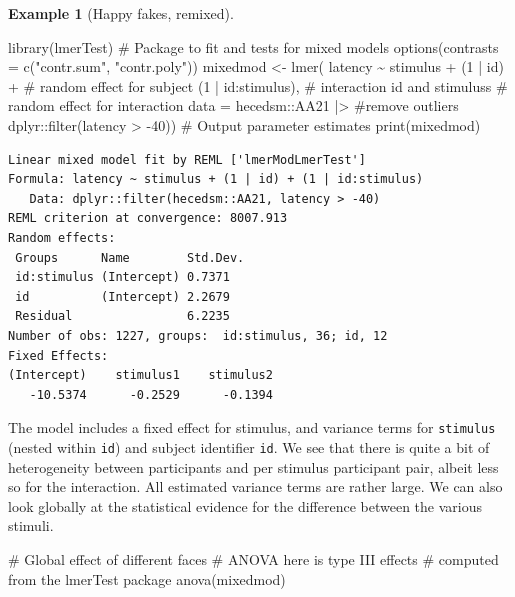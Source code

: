 \documentclass[
  11pt,
  letterpaper,
]{scrbook}
\newenvironment{Shaded}{\begin{snugshade}}{\end{snugshade}}
\newcommand{\AttributeTok}[1]{\textcolor[rgb]{0.40,0.45,0.13}{#1}}
\newcommand{\CommentTok}[1]{\textcolor[rgb]{0.37,0.37,0.37}{#1}}
\newcommand{\DecValTok}[1]{\textcolor[rgb]{0.68,0.00,0.00}{#1}}
\newcommand{\FunctionTok}[1]{\textcolor[rgb]{0.28,0.35,0.67}{#1}}
\newcommand{\NormalTok}[1]{\textcolor[rgb]{0.00,0.23,0.31}{#1}}
\newcommand{\OtherTok}[1]{\textcolor[rgb]{0.00,0.23,0.31}{#1}}
\newcommand{\SpecialCharTok}[1]{\textcolor[rgb]{0.37,0.37,0.37}{#1}}
\newcommand{\StringTok}[1]{\textcolor[rgb]{0.13,0.47,0.30}{#1}}
\theoremstyle{definition}
\newtheorem{example}{Example}[chapter]
\theoremstyle{remark}
\begin{document}
\begin{example}[Happy fakes,
remixed]
\begin{Shaded}
\begin{Highlighting}[]
\FunctionTok{library}\NormalTok{(lmerTest) }\CommentTok{\# Package to fit and tests for mixed models}
\FunctionTok{options}\NormalTok{(}\AttributeTok{contrasts =} \FunctionTok{c}\NormalTok{(}\StringTok{"contr.sum"}\NormalTok{, }\StringTok{"contr.poly"}\NormalTok{))}
\NormalTok{mixedmod }\OtherTok{\textless{}{-}} \FunctionTok{lmer}\NormalTok{(}
\NormalTok{  latency }\SpecialCharTok{\textasciitilde{}}\NormalTok{ stimulus }\SpecialCharTok{+} 
\NormalTok{    (}\DecValTok{1} \SpecialCharTok{|}\NormalTok{ id) }\SpecialCharTok{+} \CommentTok{\# random effect for subject}
\NormalTok{    (}\DecValTok{1} \SpecialCharTok{|}\NormalTok{ id}\SpecialCharTok{:}\NormalTok{stimulus), }\CommentTok{\# interaction id and stimuluss}
  \CommentTok{\# random effect for interaction }
  \AttributeTok{data =}\NormalTok{ hecedsm}\SpecialCharTok{::}\NormalTok{AA21 }\SpecialCharTok{|\textgreater{}} \CommentTok{\#remove outliers}
\NormalTok{    dplyr}\SpecialCharTok{::}\FunctionTok{filter}\NormalTok{(latency }\SpecialCharTok{\textgreater{}} \SpecialCharTok{{-}}\DecValTok{40}\NormalTok{))}
\CommentTok{\# Output parameter estimates}
\FunctionTok{print}\NormalTok{(mixedmod)}
\end{Highlighting}
\end{Shaded}

\begin{verbatim}
Linear mixed model fit by REML ['lmerModLmerTest']
Formula: latency ~ stimulus + (1 | id) + (1 | id:stimulus)
   Data: dplyr::filter(hecedsm::AA21, latency > -40)
REML criterion at convergence: 8007.913
Random effects:
 Groups      Name        Std.Dev.
 id:stimulus (Intercept) 0.7371  
 id          (Intercept) 2.2679  
 Residual                6.2235  
Number of obs: 1227, groups:  id:stimulus, 36; id, 12
Fixed Effects:
(Intercept)    stimulus1    stimulus2  
   -10.5374      -0.2529      -0.1394  
\end{verbatim}

The model includes a fixed effect for stimulus, and variance terms for
\texttt{stimulus} (nested within \texttt{id}) and subject identifier
\texttt{id}. We see that there is quite a bit of heterogeneity between
participants and per stimulus participant pair, albeit less so for the
interaction. All estimated variance terms are rather large. We can also
look globally at the statistical evidence for the difference between the
various stimuli.

\begin{Shaded}
\begin{Highlighting}[]
\CommentTok{\# Global effect of different faces}
\CommentTok{\# ANOVA here is type III effects }
\CommentTok{\# computed from the \textquotesingle{}lmerTest\textquotesingle{} package}
\FunctionTok{anova}\NormalTok{(mixedmod)}
\end{Highlighting}
\end{Shaded}


\end{example}
\end{document}
